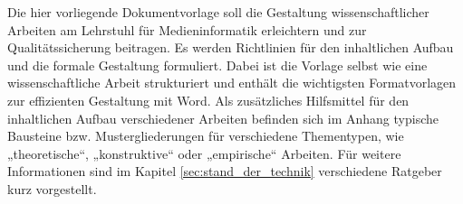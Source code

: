 \label{sec:zusammenfassung}

Die hier vorliegende Dokumentvorlage soll die Gestaltung wissenschaftlicher Arbeiten am Lehrstuhl für Medieninformatik erleichtern und zur Qualitätssicherung beitragen. Es werden Richtlinien für den inhaltlichen Aufbau und die formale Gestaltung formuliert. Dabei ist die Vorlage selbst wie eine wissenschaftliche Arbeit strukturiert und enthält die wichtigsten Formatvorlagen zur effizienten Gestaltung mit Word. Als zusätzliches Hilfsmittel für den inhaltlichen Aufbau verschiedener Arbeiten befinden sich im Anhang typische Bausteine bzw. Mustergliederungen für verschiedene Thementypen, wie „theoretische“, „konstruktive“ oder „empirische“ Arbeiten. Für weitere Informationen sind im Kapitel \ref{sec:stand_der_technik} verschiedene Ratgeber kurz vorgestellt. 

